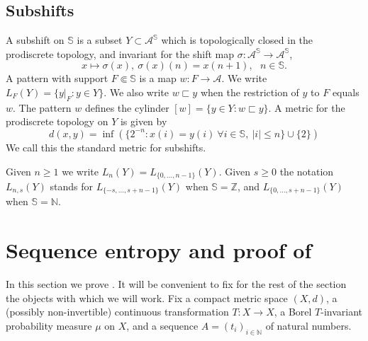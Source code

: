 \documentclass[a4paper,oneside]{amsart}
\renewcommand{\(}{\begin{dmath*}}
\renewcommand{\)}{\end{dmath*}}
\theoremstyle{definition}
\newcommand{\N}{\mathbb{N}}
\newcommand{\Z}{\mathbb{Z}}
\newcommand{\SE}{\mathbb{S}}
\newcommand{\A}{\mathcal{A}}
\begin{document}
\subsection{Subshifts}\label{subsec:subshifts} A subshift on $\SE$ is a subset  $Y\subset \A^{\SE}$ which is topologically closed in the prodiscrete topology, and invariant for the shift map $\sigma\colon \A^{\SE}\to \A^{\SE}$,
\[x\mapsto \sigma(x), \ \sigma(x)(n)=x(n+1), \ \ \ n\in\SE.\]
A pattern with support $F\Subset\SE$ is a map $w\colon F\to \A$. We write $L_F(Y)=\{y|_F : y\in Y\}$. We also write $w\sqsubset y$ when the restriction of $y$ to $F$ equals $w$. The pattern $w$ defines the cylinder $[w]=\{y\in Y : w\sqsubset y\}$. A metric for the prodiscrete topology on $Y$ is given by
\[d(x,y)=\inf(\{2^{-n} : x(i)=y(i) \ \forall i\in \SE, \ |i|\leq n\} \cup \{2\})\]
We call this the standard metric for subshifts. 

Given $n\geq 1$ we write $L_n(Y)=L_{\{0,\dots,n-1\}}(Y)$. Given $s\geq 0$   the notation $L_{n,s}(Y)$ stands for $L_{\{-s,\dots,s+n-1\}}(Y)$ when $\SE=\Z$, and $L_{\{0,\dots,s+n-1\}}(Y)$ when $\SE=\N$.

\section{Sequence entropy and proof of }
In this section we prove . It will be convenient to fix for the rest of the section the objects with which we will work. Fix a compact metric space $(X,d)$, a (possibly non-invertible) continuous transformation $T\colon X\to X$,  a Borel $T$-invariant probability measure $\mu$ on $X$, and a sequence $A=(t_i)_{i\in\N}$ of natural numbers.
\end{document}

